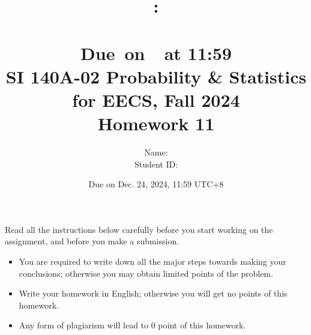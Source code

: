 \documentclass[a4paper]{article}
\title{
    \vspace{2in}
    \textmd{\textbf{\hmwkClass:\\  \hmwkTitle}}\\
    \normalsize\vspace{0.1in}\small{Due\ on\ \hmwkDueDate\ at 11:59}\\
	\vspace{4in}
}
\author{
	Name: \textbf{\hmwkAuthorName} \\
	Student ID: \hmwkAuthorID}
\date{}
\begin{document}

\date{
Due on Dec. 24, 2024, 11:59 UTC+8}
\title{SI 140A-02  Probability \& Statistics for EECS, Fall 2024 \\
Homework 11}
\maketitle
Read all the instructions below carefully before you start working on the assignment, and before you make a submission.
\begin{itemize}
    \item You are required to write down all the major steps towards making your conclusions; otherwise you may obtain limited points of the problem.
    \item Write your homework in English; otherwise you will get no points of this homework.
    \item Any form of plagiarism will lead to $0$ point of this homework. 
\end{itemize}
\newpage
\end{document}
